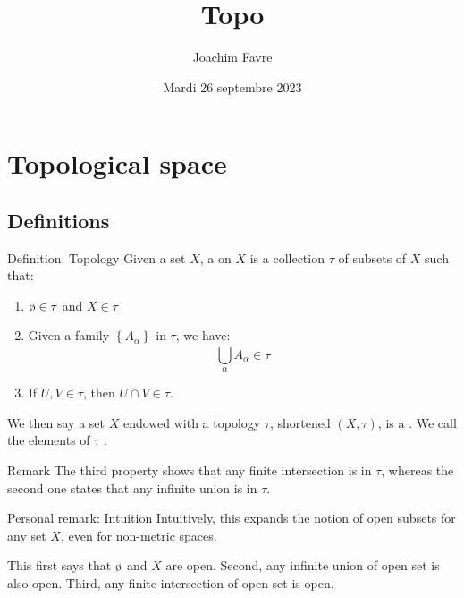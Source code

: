 \documentclass[a4paper]{article}
\title{Topo}
\author{Joachim Favre}
\date{Mardi 26 septembre 2023}
\begin{document}
\maketitle


\section{Topological space}

\subsection{Definitions}


\begin{parag}{Definition: Topology}
    Given a set $X$, a  on $X$ is a collection $\tau$ of subsets of $X$ such that:
    \begin{enumerate}
        \item $\o \in \tau$ and $X \in \tau$
        \item Given a family $\left\{A_{\alpha}\right\}$ in $\tau$, we have: 
        \[\bigcup_{\alpha}^{} A_{\alpha} \in \tau\]
        \item If $U, V \in \tau$, then $U \cap V \in \tau$.
    \end{enumerate}

    We then say a set $X$ endowed with a topology $\tau$, shortened $\left(X, \tau\right)$, is a . We call the elements of $\tau$ .

    \begin{subparag}{Remark}
        The third property shows that any finite intersection is in $\tau$, whereas the second one states that any infinite union is in $\tau$.
    \end{subparag}

    \begin{subparag}{Personal remark: Intuition}
        Intuitively, this expands the notion of open subsets for any set $X$, even for non-metric spaces.

        This first says that $\o$ and $X$ are open. Second, any infinite union of open set is also open. Third, any finite intersection of open set is open.
    \end{subparag}
\end{parag}
\end{document}

